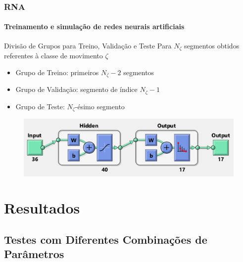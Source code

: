 \documentclass{beamer}
\begin{document}
	\begin{frame}
		\frametitle{RNA}
		\framesubtitle{Treinamento e simulação de redes neurais artificiais}
		\begin{alertblock}{Divisão de Grupos para Treino, Validação e Teste}
			Para $N_\zeta$ segmentos obtidos referentes à classe de movimento $\zeta$ \\
			\begin{itemize}
				\item Grupo de Treino: primeiros $N_\zeta-2$ segmentos
				\item Grupo de Validação: segmento de índice $N_\zeta-1$
				\item Grupo de Teste: $N_\zeta$-ésimo segmento
			\end{itemize}
		\end{alertblock}
		\begin{figure}
			\begin{center}
				\includegraphics[width=\textwidth]{./img/matlabRNA.png}
			\end{center}
		\end{figure}
	\end{frame}

	\section[Resultados]{Resultados}
	\subsection[Testes com Diferentes Combinações de Parâmetros]{Testes com Diferentes Combinações de Parâmetros}
	
\end{document}
